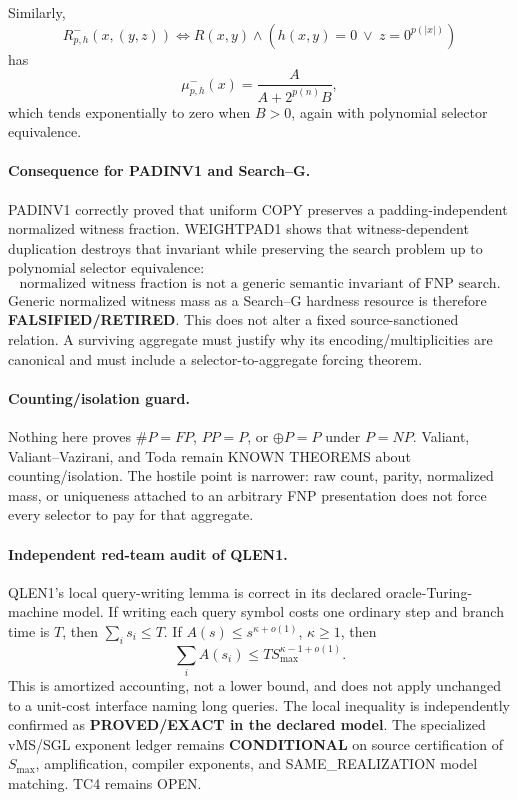 \documentclass[11pt]{article}
\begin{document}
Similarly,
\[
R^{-}_{p,h}(x,(y,z))\iff R(x,y)\wedge(h(x,y)=0\ \vee\ z=0^{p(|x|)})
\]
has
\[
\boxed{\mu^-_{p,h}(x)=\frac{A}{A+2^{p(n)}B}},
\]
which tends exponentially to zero when $B>0$, again with polynomial selector equivalence.

\paragraph{Consequence for PADINV1 and Search--G.}
PADINV1 correctly proved that uniform COPY preserves a padding-independent normalized witness fraction. WEIGHTPAD1 shows that witness-dependent duplication destroys that invariant while preserving the search problem up to polynomial selector equivalence:
\[
\boxed{\text{normalized witness fraction is not a generic semantic invariant of FNP search}.}
\]
Generic normalized witness mass as a Search--G hardness resource is therefore \textbf{FALSIFIED/RETIRED}. This does not alter a fixed source-sanctioned relation. A surviving aggregate must justify why its encoding/multiplicities are canonical and must include a selector-to-aggregate forcing theorem.

\paragraph{Counting/isolation guard.}
Nothing here proves $\#P=FP$, $PP=P$, or $\oplus P=P$ under $P=NP$. Valiant, Valiant--Vazirani, and Toda remain KNOWN THEOREMS about counting/isolation. The hostile point is narrower: raw count, parity, normalized mass, or uniqueness attached to an arbitrary FNP presentation does not force every selector to pay for that aggregate.

\paragraph{Independent red-team audit of QLEN1.}
QLEN1's local query-writing lemma is correct in its declared oracle-Turing-machine model. If writing each query symbol costs one ordinary step and branch time is $T$, then $\sum_i s_i\le T$. If $A(s)\le s^{\kappa+o(1)}$, $\kappa\ge1$, then
\[
\boxed{\sum_i A(s_i)\le T S_{\max}^{\kappa-1+o(1)}}.
\]
This is amortized accounting, not a lower bound, and does not apply unchanged to a unit-cost interface naming long queries. The local inequality is independently confirmed as \textbf{PROVED/EXACT in the declared model}. The specialized vMS/SGL exponent ledger remains \textbf{CONDITIONAL} on source certification of $S_{\max}$, amplification, compiler exponents, and SAME\_REALIZATION model matching. TC4 remains OPEN.
\end{document}

